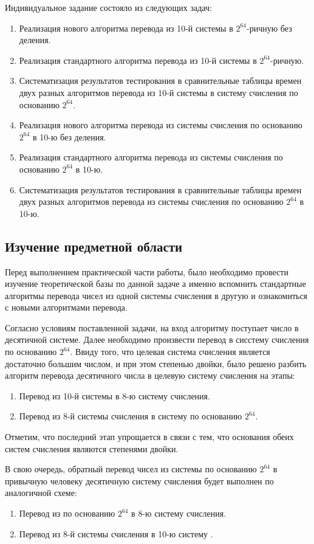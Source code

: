 \documentclass[14pt, russian]{scrartcl}
\begin{document}
Индивидуальное задание состояло из следующих задач:
\begin{enumerate}
\item Реализация нового алгоритма перевода из 10-й системы в $2^{64}$-ричную без деления.
\item Реализация стандартного алгоритма перевода из 10-й системы в $2^{64}$-ричную.
\item Систематизация результатов тестирования в сравнительные таблицы времен двух разных алгоритмов перевода из 10-й системы в систему счисления по основанию $2^{64}$.
\item Реализация нового алгоритма перевода из системы счисления по основанию $2^{64}$ в 10-ю без деления.
\item Реализация стандартного алгоритма перевода из системы счисления по основанию $2^{64}$ в 10-ю.
\item Систематизация результатов тестирования в сравнительные таблицы времен двух разных алгоритмов перевода из системы счисления по основанию $2^{64}$ в 10-ю.
\end{enumerate}

\subsection{Изучение предметной области}
Перед выполнением практической части работы, было необходимо провести изучение теоретической базы по данной задаче а именно вспомнить стандартные алгоритмы перевода чисел из одной системы счисления в другую и ознакомиться с новыми алгоритмами перевода. 

Согласно условиям поставленной задачи, на вход алгоритму поступает число в десятичной системе. Далее необходимо произвести перевод в сисстему счисления по основанию $2^{64}$. Ввиду того, что целевая система счисления является достаточно большим числом, и при этом степенью двойки, было решено разбить алгоритм перевода десятичного числа в целевую систему счисления на этапы:
\begin{enumerate}
\item Перевод из 10-й системы в 8-ю систему счисления.
\item Перевод из 8-й системы счисления в систему по основанию $2^{64}$.
\end{enumerate}

Отметим, что последний этап упрощается в связи с тем, что основания обеих систем счисления являются степенями двойки. 

В свою очередь, обратный перевод чисел из системы по основанию $2^{64}$ в привычную человеку десятичную систему счисления будет выполнен по аналогичной схеме:
\begin{enumerate}
\item Перевод из по основанию $2^{64}$ в 8-ю систему счисления.
\item Перевод из 8-й системы счисления в 10-ю систему .
\end{enumerate}
\end{document}

